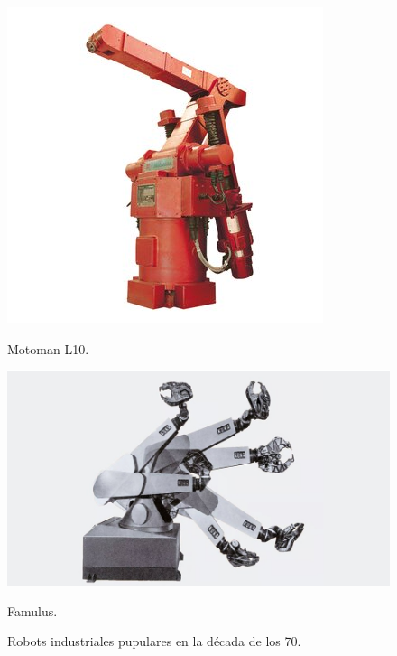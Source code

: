 \begin{figure}[ht!]
	\centering
	\begin{minipage}{0.39\linewidth}
		\centering
		\includegraphics[width=\linewidth]{figs/motoman.jpg}
		\caption*{\centering Motoman L10.}
	\end{minipage}
	\begin{minipage}{0.59\linewidth}
		\centering
		\includegraphics[width=\linewidth]{figs/famulus.jpg}
		\caption*{\centering Famulus.} 
	\end{minipage}
	\caption{Robots industriales pupulares en la década de los 70.}
	\label{fig:ancientrel}
\end{figure}

